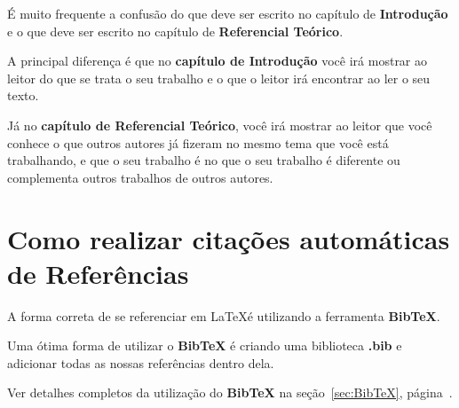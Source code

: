 É muito frequente a confusão do que deve ser escrito no capítulo de {\bf Introdução} e o que deve ser escrito no capítulo de {\bf Referencial Teórico}.

A principal diferença é que no {\bf capítulo de Introdução} você irá mostrar ao leitor do que se trata o seu trabalho e o que o leitor irá encontrar ao ler o seu texto.

Já no {\bf capítulo de Referencial Teórico}, você irá mostrar ao leitor que você conhece o que outros autores já fizeram no mesmo tema que você está trabalhando, e que o seu trabalho é no que o seu trabalho é diferente ou complementa outros trabalhos de outros autores.


\section{Como realizar citações automáticas de Referências}

A forma correta de se referenciar em \LaTeX é utilizando a ferramenta {\bf BibTeX}.

Uma ótima forma de utilizar o {\bf BibTeX} é criando uma biblioteca {\bf *.bib} e adicionar todas as nossas referências dentro dela.

Ver detalhes completos da utilização do {\bf BibTeX} na seção~\ref{sec:BibTeX}, página~\pageref{sec:BibTeX}.

